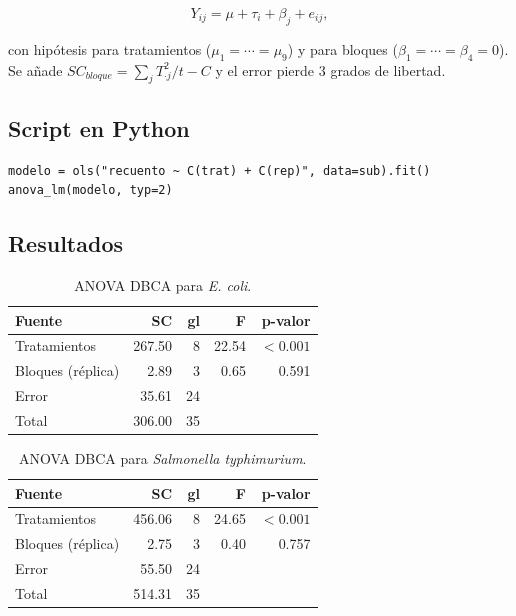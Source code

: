 \documentclass[12pt,a4paper]{article}
\begin{document}
\[
Y_{ij} = \mu + \tau_i + \beta_j + e_{ij},
\]

con hipótesis para tratamientos ($\mu_1=\cdots=\mu_9$) y para bloques ($\beta_1=\cdots=\beta_4=0$). Se añade $SC_{bloque}=\sum_j T_{\cdot j}^2/t - C$ y el error pierde 3 grados de libertad.

\subsection{Script en Python}

\begin{lstlisting}[caption={ANOVA del DBCA (bloque = réplica).}]
modelo = ols("recuento ~ C(trat) + C(rep)", data=sub).fit()
anova_lm(modelo, typ=2)
\end{lstlisting}

\subsection{Resultados}

\begin{table}[H]
\centering
\caption{ANOVA DBCA para \textit{E. coli}.}
\begin{tabular}{lrrrr}
\toprule
\textbf{Fuente} & \textbf{SC} & \textbf{gl} & \textbf{F} & \textbf{p-valor}\\
\midrule
Tratamientos & 267.50 & 8 & 22.54 & $<0.001$\\
Bloques (réplica) & 2.89 & 3 & 0.65 & 0.591\\
Error & 35.61 & 24 & &\\
Total & 306.00 & 35 & &\\
\bottomrule
\end{tabular}
\end{table}

\begin{table}[H]
\centering
\caption{ANOVA DBCA para \textit{Salmonella typhimurium}.}
\begin{tabular}{lrrrr}
\toprule
\textbf{Fuente} & \textbf{SC} & \textbf{gl} & \textbf{F} & \textbf{p-valor}\\
\midrule
Tratamientos & 456.06 & 8 & 24.65 & $<0.001$\\
Bloques (réplica) & 2.75 & 3 & 0.40 & 0.757\\
Error & 55.50 & 24 & &\\
Total & 514.31 & 35 & &\\
\bottomrule
\end{tabular}
\end{table}
\end{document}
